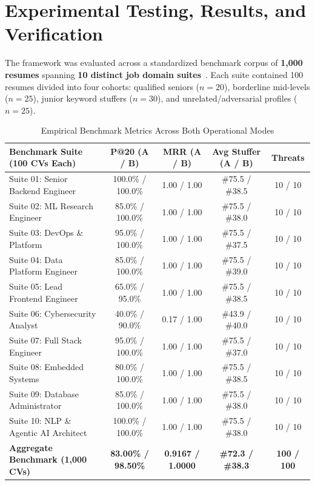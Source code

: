 \documentclass[12pt,a4paper]{article}
\begin{document}
\section{Experimental Testing, Results, and Verification}
The framework was evaluated across a standardized benchmark corpus of \textbf{1,000 resumes} spanning \textbf{10 distinct job domain suites}~\cite{benchmark_suite}. Each suite contained 100 resumes divided into four cohorts: qualified seniors ($n=20$), borderline mid-levels ($n=25$), junior keyword stuffers ($n=30$), and unrelated/adversarial profiles ($n=25$).

\vspace{-2pt}
\begin{table}[h]
\centering
\scriptsize
{}
\caption{Empirical Benchmark Metrics Across Both Operational Modes}
\vspace{2pt}
\begin{tabularx}{\textwidth}{Xcccc}
\toprule
\textbf{Benchmark Suite (100 CVs Each)} & \textbf{P@20 (A / B)} & \textbf{MRR (A / B)} & \textbf{Avg Stuffer (A / B)} & \textbf{Threats} \\
\midrule
Suite 01: Senior Backend Engineer      & 100.0\% / 100.0\% & 1.00 / 1.00 & \#75.5 / \#38.5 & 10 / 10 \\
Suite 02: ML Research Engineer         & 85.0\% / 100.0\%  & 1.00 / 1.00 & \#75.5 / \#38.0 & 10 / 10 \\
Suite 03: DevOps \& Platform           & 95.0\% / 100.0\%  & 1.00 / 1.00 & \#75.5 / \#37.5 & 10 / 10 \\
Suite 04: Data Platform Engineer       & 85.0\% / 100.0\%  & 1.00 / 1.00 & \#75.5 / \#39.0 & 10 / 10 \\
Suite 05: Lead Frontend Engineer       & 65.0\% / 95.0\%   & 1.00 / 1.00 & \#75.5 / \#38.5 & 10 / 10 \\
Suite 06: Cybersecurity Analyst        & 40.0\% / 90.0\%   & 0.17 / 1.00 & \#43.9 / \#40.0 & 10 / 10 \\
Suite 07: Full Stack Engineer          & 95.0\% / 100.0\%  & 1.00 / 1.00 & \#75.5 / \#37.0 & 10 / 10 \\
Suite 08: Embedded Systems             & 80.0\% / 100.0\%  & 1.00 / 1.00 & \#75.5 / \#38.5 & 10 / 10 \\
Suite 09: Database Administrator       & 85.0\% / 100.0\%  & 1.00 / 1.00 & \#75.5 / \#38.0 & 10 / 10 \\
Suite 10: NLP \& Agentic AI Architect  & 100.0\% / 100.0\% & 1.00 / 1.00 & \#75.5 / \#38.0 & 10 / 10 \\
\midrule
\textbf{Aggregate Benchmark (1,000 CVs)} & \textbf{83.00\% / 98.50\%} & \textbf{0.9167 / 1.0000} & \textbf{\#72.3 / \#38.3} & \textbf{100 / 100} \\
\bottomrule
\end{tabularx}
\end{table}
\vspace{-4pt}
\end{document}
